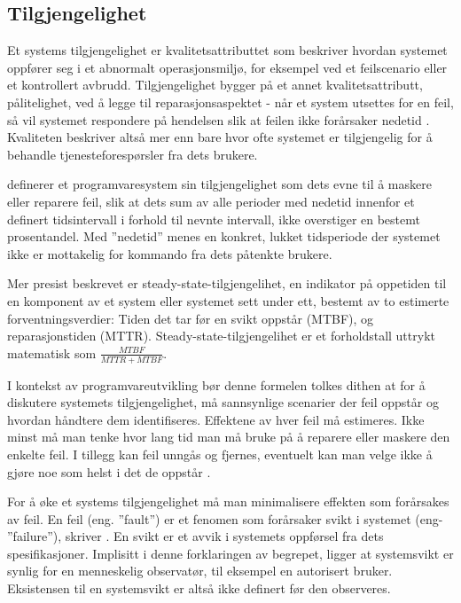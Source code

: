 \subsection{Tilgjengelighet}

Et systems tilgjengelighet er kvalitetsattributtet som beskriver hvordan systemet oppfører seg i et abnormalt operasjonsmiljø, for eksempel ved et feilscenario eller et kontrollert avbrudd. Tilgjengelighet bygger på et annet kvalitetsattributt, pålitelighet, ved å legge til reparasjonsaspektet - når et system utsettes for en feil, så vil systemet respondere på hendelsen slik at feilen ikke forårsaker nedetid \citep{BCK2013}. Kvaliteten beskriver altså mer enn bare hvor ofte systemet er tilgjengelig for å behandle tjenesteforespørsler fra dets brukere.

\cite{BCK2013} definerer et programvaresystem sin tilgjengelighet som dets evne til å maskere eller reparere feil, slik at dets sum av alle perioder med nedetid innenfor et definert tidsintervall i forhold til nevnte intervall, ikke overstiger en bestemt prosentandel. Med ''nedetid'' menes en konkret, lukket tidsperiode der systemet ikke er mottakelig for kommando fra dets påtenkte brukere.

Mer presist beskrevet er steady-state-tilgjengelihet, en indikator på oppetiden til en komponent av et system eller systemet sett under ett, bestemt av to estimerte forventningsverdier: Tiden det tar før en svikt oppstår (MTBF), og reparasjonstiden (MTTR). Steady-state-tilgjengelihet er et forholdstall uttrykt matematisk som $ \frac{MTBF}{MTTR+MTBF} $.

I kontekst av programvareutvikling bør denne formelen tolkes dithen at for å diskutere systemets tilgjengelighet, må sannsynlige scenarier der feil oppstår og hvordan håndtere dem identifiseres. Effektene av hver feil må estimeres. Ikke minst må man tenke hvor lang tid man må bruke på å reparere eller maskere den enkelte feil. I tillegg kan feil unngås og fjernes, eventuelt kan man velge ikke å gjøre noe som helst i det de oppstår \citep{BCK2013}.

For å øke et systems tilgjengelighet må man minimalisere effekten som forårsakes av feil. En feil (eng. ''fault'') er et fenomen som forårsaker svikt i systemet (eng- ''failure''), skriver \cite{BCK2013}. En svikt er et avvik i systemets oppførsel fra dets spesifikasjoner. Implisitt i denne forklaringen av begrepet, ligger at systemsvikt er synlig for en menneskelig observatør, til eksempel en autorisert bruker. Eksistensen til en systemsvikt er altså ikke definert før den observeres.

